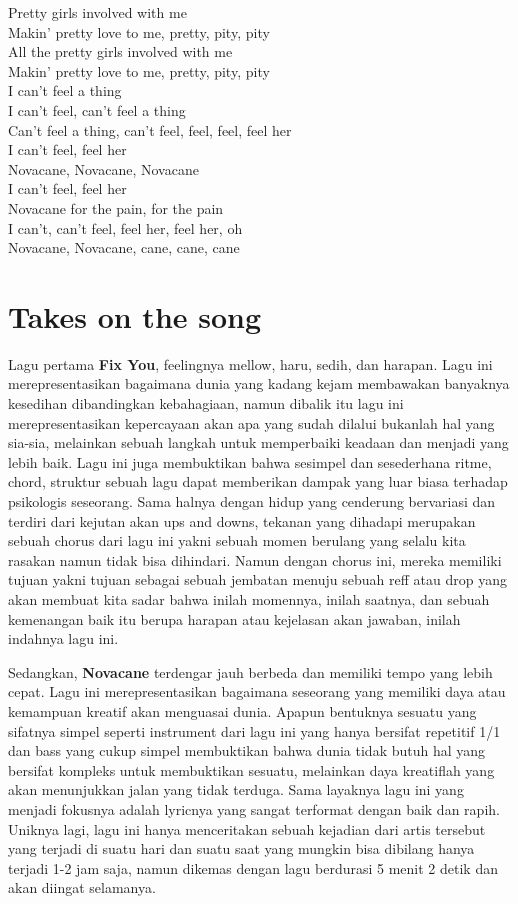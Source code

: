 \documentclass[
  letterpaper,
  DIV=11,
  numbers=noendperiod]{scrreprt}
\begin{document}
Pretty girls involved with me\\
Makin' pretty love to me, pretty, pity, pity\\
All the pretty girls involved with me\\
Makin' pretty love to me, pretty, pity, pity\\
I can't feel a thing\\
I can't feel, can't feel a thing\\
Can't feel a thing, can't feel, feel, feel, feel her\\
I can't feel, feel her\\
Novacane, Novacane, Novacane\\
I can't feel, feel her\\
Novacane for the pain, for the pain\\
I can't, can't feel, feel her, feel her, oh\\
Novacane, Novacane, cane, cane, cane

\section{Takes on the song}\label{takes-on-the-song}

Lagu pertama \textbf{Fix You}, feelingnya mellow, haru, sedih, dan
harapan. Lagu ini merepresentasikan bagaimana dunia yang kadang kejam
membawakan banyaknya kesedihan dibandingkan kebahagiaan, namun dibalik
itu lagu ini merepresentasikan kepercayaan akan apa yang sudah dilalui
bukanlah hal yang sia-sia, melainkan sebuah langkah untuk memperbaiki
keadaan dan menjadi yang lebih baik. Lagu ini juga membuktikan bahwa
sesimpel dan sesederhana ritme, chord, struktur sebuah lagu dapat
memberikan dampak yang luar biasa terhadap psikologis seseorang. Sama
halnya dengan hidup yang cenderung bervariasi dan terdiri dari kejutan
akan ups and downs, tekanan yang dihadapi merupakan sebuah chorus dari
lagu ini yakni sebuah momen berulang yang selalu kita rasakan namun
tidak bisa dihindari. Namun dengan chorus ini, mereka memiliki tujuan
yakni tujuan sebagai sebuah jembatan menuju sebuah reff atau drop yang
akan membuat kita sadar bahwa inilah momennya, inilah saatnya, dan
sebuah kemenangan baik itu berupa harapan atau kejelasan akan jawaban,
inilah indahnya lagu ini.

Sedangkan, \textbf{Novacane} terdengar jauh berbeda dan memiliki tempo
yang lebih cepat. Lagu ini merepresentasikan bagaimana seseorang yang
memiliki daya atau kemampuan kreatif akan menguasai dunia. Apapun
bentuknya sesuatu yang sifatnya simpel seperti instrument dari lagu ini
yang hanya bersifat repetitif 1/1 dan bass yang cukup simpel membuktikan
bahwa dunia tidak butuh hal yang bersifat kompleks untuk membuktikan
sesuatu, melainkan daya kreatiflah yang akan menunjukkan jalan yang
tidak terduga. Sama layaknya lagu ini yang menjadi fokusnya adalah
lyricnya yang sangat terformat dengan baik dan rapih. Uniknya lagi, lagu
ini hanya menceritakan sebuah kejadian dari artis tersebut yang terjadi
di suatu hari dan suatu saat yang mungkin bisa dibilang hanya terjadi
1-2 jam saja, namun dikemas dengan lagu berdurasi 5 menit 2 detik dan
akan diingat selamanya.
\end{document}

